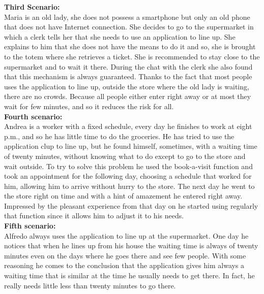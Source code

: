 \textbf{Third Scenario:}\\
Maria is an old lady, she does not possess a smartphone but only an old phone that does not have Internet connection.
She decides to go to the supermarket in which a clerk tells her that she needs to use an application to line up. She explains to him that she does not have the means to do it and so, she is brought to the totem where she retrieves a ticket. She is recommended to stay close to the supermarket and to wait it there. During the chat with the clerk she also found that this mechanism is always guaranteed.
Thanks to the fact that most people uses the application to line up, outside the store where the old lady is waiting, there are no crowds. Because all people either enter right away or at most they wait for few minutes, and so it reduces the risk for all.\\

\textbf{Fourth scenario:}\\
Andrea is a worker with a fixed schedule, every day he finishes to work at eight p.m., and so he has little time to do the groceries. He has tried to use the application \gls{clup} to line up, but he found himself, sometimes, with a waiting time of twenty minutes, without knowing what to do except to go to the store and wait outside. To try to solve this problem he used the book-a-visit function and took an appointment for the following day, choosing a schedule that worked for him, allowing him to arrive without hurry to the store. The next day he went to the store right on time and with a hint of amazement he entered right away. Impressed by the pleasant experience from that day on he started using regularly that function since it allows him to adjust it to his needs.\\


\textbf{Fifth scenario:}\\
Alfredo always uses the application to line up at the supermarket. One day he notices that when he lines up from his house the waiting time is always of twenty minutes even on the days where he goes there and see few people. With some reasoning he comes to the conclusion that the application gives him always a waiting time that is similar at the time he usually needs to get there. In fact, he really needs little less than twenty minutes to go there.\\


